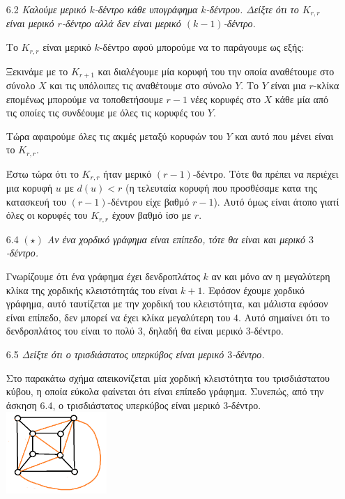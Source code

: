 \documentclass[a4paper, oneside, 11pt]{article}
\theoremstyle{definition}
\begin{document}
\begin{enumerate}
   \item[6.2] \emph{Καλούμε μερικό $k$-δέντρο κάθε υπογράφημα $k$-δέντρου.
   Δείξτε ότι το $K_{r,r}$ είναι μερικό $r$-δέντρο αλλά δεν είναι μερικό
   $(k-1)$-δέντρο.}

   Το $K_{r,r}$ είναι μερικό $k$-δέντρο αφού μπορούμε να το παράγουμε
   ως εξής:

   Ξεκινάμε με το $K_{r+1}$ και διαλέγουμε μία κορυφή του την οποία
   αναθέτουμε στο σύνολο $X$ και τις υπόλοιπες τις αναθέτουμε στο σύνολο
   $Y$. Το $Y$ είναι μια $r$-κλίκα επομένως μπορούμε να τοποθετήσουμε
   $r-1$ νέες κορυφές στο $X$ κάθε μία από τις οποίες τις συνδέουμε
   με όλες τις κορυφές του $Y$.

   Τώρα αφαιρούμε όλες τις ακμές μεταξύ κορυφών του $Y$ και αυτό
   που μένει είναι το $K_{r,r}$.

   Έστω τώρα ότι το $K_{r,r}$ ήταν μερικό $(r-1)$-δέντρο. Τότε θα πρέπει
   να περιέχει μια κορυφή $u$ με $d(u) < r$ (η τελευταία κορυφή που προσθέσαμε
   κατα της κατασκευή του $(r-1)$-δέντρου είχε βαθμό $r-1$). Αυτό όμως είναι
   άτοπο γιατί όλες οι κορυφές του $K_{r,r}$ έχουν βαθμό ίσο με $r$.


	\item[6.4] \emph{$(\star)$ Αν ένα χορδικό γράφημα είναι επίπεδο, τότε θα είναι και μερικό $3$-δέντρο.}

Γνωρίζουμε ότι ένα γράφημα έχει δενδροπλάτος $k$ αν και μόνο αν η μεγαλύτερη κλίκα της χορδικής κλειστότητάς του είναι $k+1$. Εφόσον έχουμε χορδικό γράφημα, αυτό ταυτίζεται με την χορδική του κλειστότητα,
και μάλιστα εφόσον είναι επίπεδο, δεν μπορεί να έχει κλίκα μεγαλύτερη του $4$. Αυτό σημαίνει ότι το δενδροπλάτος του είναι το πολύ $3$, δηλαδή θα είναι μερικό $3$-δέντρο.

	\item[6.5] \emph{Δείξτε ότι ο τρισδιάστατος υπερκύβος είναι μερικό $3$-δέντρο.}

Στο παρακάτω σχήμα απεικονίζεται μία χορδική κλειστότητα του τρισδιάστατου κύβου, η οποία εύκολα φαίνεται ότι είναι επίπεδο γράφημα. Συνεπώς, από την άσκηση $6.4$, ο τρισδιάστατος υπερκύβος είναι μερικό 
$3$-δέντρο.
\newline
\includegraphics[width=0.3\textwidth]{./pics/graph1.png}


\end{enumerate}
\end{document}
